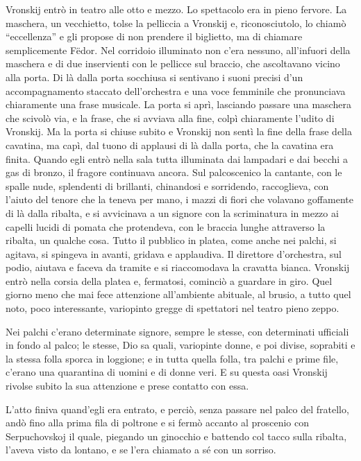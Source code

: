 Vronskij entrò in teatro alle otto e mezzo. Lo spettacolo era in pieno fervore. La maschera, un vecchietto, tolse la pelliccia a Vronskij e, riconosciutolo, lo chiamò ``eccellenza'' e gli propose di non prendere il biglietto, ma di chiamare semplicemente Fëdor. Nel corridoio illuminato non c'era nessuno, all'infuori della maschera e di due inservienti con le pellicce sul braccio, che ascoltavano vicino alla porta. Di là dalla porta socchiusa si sentivano i suoni precisi d'un accompagnamento staccato dell'orchestra e una voce femminile che pronunciava chiaramente una frase musicale. La porta si aprì, lasciando passare una maschera che scivolò via, e la frase, che si avviava alla fine, colpì chiaramente l'udito di Vronskij. Ma la porta si chiuse subito e Vronskij non sentì la fine della frase della cavatina, ma capì, dal tuono di applausi di là dalla porta, che la cavatina era finita. Quando egli entrò nella sala tutta illuminata dai lampadari e dai becchi a gas di bronzo, il fragore continuava ancora. Sul palcoscenico la cantante, con le spalle nude, splendenti di brillanti, chinandosi e sorridendo, raccoglieva, con l'aiuto del tenore che la teneva per mano, i mazzi di fiori che volavano goffamente di là dalla ribalta, e si avvicinava a un signore con la scriminatura in mezzo ai capelli lucidi di pomata che protendeva, con le braccia lunghe attraverso la ribalta, un qualche cosa. Tutto il pubblico in platea, come anche nei palchi, si agitava, si spingeva in avanti, gridava e applaudiva. Il direttore d'orchestra, sul podio, aiutava e faceva da tramite e si riaccomodava la cravatta bianca. Vronskij entrò nella corsia della platea e, fermatosi, cominciò a guardare in giro. Quel giorno meno che mai fece attenzione all'ambiente abituale, al brusio, a tutto quel noto, poco interessante, variopinto gregge di spettatori nel teatro pieno zeppo. 

Nei palchi c'erano determinate signore, sempre le stesse, con determinati ufficiali in fondo al palco; le stesse, Dio sa quali, variopinte donne, e poi divise, soprabiti e la stessa folla sporca in loggione; e in tutta quella folla, tra palchi e prime file, c'erano una quarantina di uomini e di donne veri. E su questa oasi Vronskij rivolse subito la sua attenzione e prese contatto con essa. 

L'atto finiva quand'egli era entrato, e perciò, senza passare nel palco del fratello, andò fino alla prima fila di poltrone e si fermò accanto al proscenio con Serpuchovskoj il quale, piegando un ginocchio e battendo col tacco sulla ribalta, l'aveva visto da lontano, e se l'era chiamato a sé con un sorriso. 

